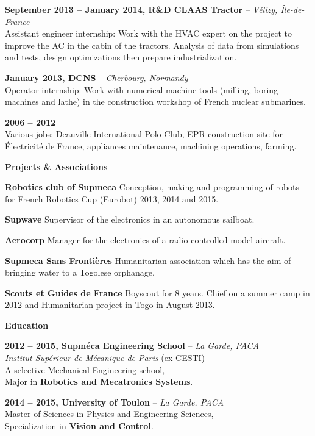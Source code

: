 \documentclass[a4paper,11pt,final]{memoir}
\newcommand{\Sep}{\vspace{1.5em}}
\newcommand{\SmallSep}{\vspace{0.5em}}
\newcommand{\CVSection}[1]
	{\Large\textbf{#1}\par
	\SmallSep\normalsize\normalfont}
\newcommand{\CVItem}[2]
	{\textbf{\color{RoyalBlue} #1 \color{dark_gray} #2}\normalsize\normalfont}
\newcommand{\city}[1]
	{{\small\color{dark_gray}\emph{#1}}\normalsize\normalfont}
\begin{document}
\CVItem{September 2013 -- January 2014,}{R\&D CLAAS Tractor} -- \city{Vélizy, Île-de-France}\\
Assistant engineer internship: Work with the HVAC expert on the project to improve the AC in the cabin of the tractors.
Analysis of data from simulations and tests, design optimizations then prepare industrialization.
\SmallSep

\CVItem{January 2013,}{DCNS} -- \city{Cherbourg, Normandy}\\
Operator internship: Work with numerical machine tools (milling, boring machines and lathe) in the construction workshop of French nuclear submarines.\SmallSep

\CVItem{2006 -- 2012}{}\\
Various jobs: Deauville International Polo Club, EPR construction site for Électricité de France, appliances maintenance, machining operations, farming.
\Sep

\CVSection{Projects \& Associations}
\CVItem{Robotics club of Supmeca}{}Conception, making and programming of robots for French Robotics Cup (Eurobot) 2013, 2014 and 2015.
\SmallSep

\CVItem{Supwave}{}Supervisor of the electronics in an autonomous sailboat.
\SmallSep

\CVItem{Aerocorp}{}Manager for the electronics of a radio-controlled model aircraft.\SmallSep

\CVItem{Supmeca Sans Frontières}{}Humanitarian association which has the aim of bringing water to a Togolese orphanage.
\SmallSep

\CVItem{Scouts et Guides de France}{}Boyscout for 8 years.
Chief on a summer camp in 2012 and Humanitarian project in Togo in August 2013.
\Sep

\CVSection{Education}
\CVItem{2012 -- 2015,}{Supméca Engineering School} -- \city{La Garde, PACA}\\
\emph{Institut Supérieur de Mécanique de Paris} (ex CESTI)\\
A selective Mechanical Engineering school,\\
Major in \textbf{Robotics and Mecatronics Systems}.
\SmallSep

\CVItem{2014 -- 2015,}{University of Toulon} -- \city{La Garde, PACA}\\
Master of Sciences in Physics and Engineering Sciences,\\
Specialization in \textbf{Vision and Control}.
\SmallSep
\end{document}
